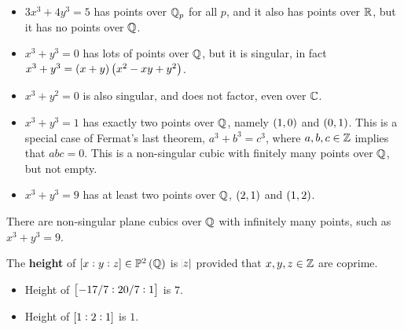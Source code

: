 \begin{example*}
\hfill
\begin{itemize}
\item $ 3x^3 + 4y^3 = 5 $ has points over $ \mathbb{Q}_p $ for all $ p $, and it also has points over $ \mathbb{R} $, but it has no points over $ \mathbb{Q} $.
\item $ x^3 + y^3 = 0 $ has lots of points over $ \mathbb{Q} $, but it is singular, in fact $ x^3 + y^3 = \br{x + y}\br{x^2 - xy + y^2} $.
\item $ x^3 + y^2 = 0 $ is also singular, and does not factor, even over $ \mathbb{C} $.
\item $ x^3 + y^3 = 1 $ has exactly two points over $ \mathbb{Q} $, namely $ \br{1, 0} $ and $ \br{0, 1} $. This is a special case of Fermat's last theorem, $ a^3 + b^3 = c^3 $, where $ a, b, c \in \mathbb{Z} $ implies that $ abc = 0 $. This is a non-singular cubic with finitely many points over $ \mathbb{Q} $, but not empty.
\item $ x^3 + y^3 = 9 $ has at least two points over $ \mathbb{Q} $, $ \br{2, 1} $ and $ \br{1, 2} $.
\end{itemize}
\end{example*}

\begin{lemma}
There are non-singular plane cubics over $ \mathbb{Q} $ with infinitely many points, such as $ x^3 + y^3 = 9 $.
\end{lemma}

The \textbf{height} of $ \sbr{x : y : z} \in \PP^2\br{\QQ} $ is $ \abs{z} $ provided that $ x, y, z \in \mathbb{Z} $ are coprime.

\begin{example*}
\hfill
\begin{itemize}
\item Height of $ \sbr{-17 / 7 : 20 / 7 : 1} $ is $ 7 $.
\item Height of $ \sbr{1 : 2 : 1} $ is $ 1 $.
\end{itemize}
\end{example*}

